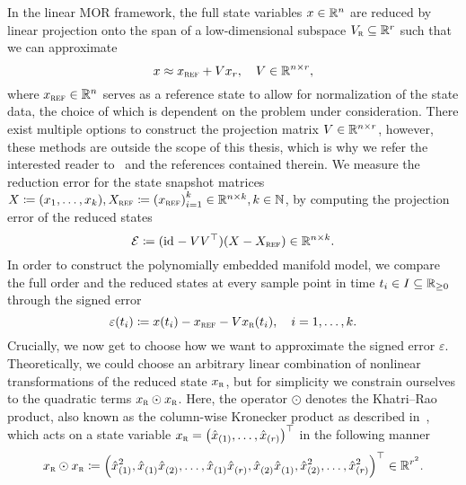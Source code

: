 In the linear MOR framework, the full state variables $x \in \mathbb{R}^n$ are reduced by linear projection onto the span of a low-dimensional subspace $V_{\textnormal{\scshape r}} \subseteq \mathbb{R}^r$ such that we can approximate
\begin{equation}\label{eq:linear-state-reduction}
    x \approx x_{\textnormal{\scshape ref}} + V x_r,\quad V \in \mathbb{R}^{n \times r},
\end{equation}
where $x_{\textnormal{\scshape ref}} \in \mathbb{R}^n$ serves as a reference state to allow for normalization of the state data, the choice of which is dependent on the problem under consideration.
There exist multiple options to construct the projection matrix $V \in \mathbb{R}^{n \times r}$, however, these methods are outside the scope of this thesis, which is why we refer the interested reader to~\cite{BOP2017, BCO2017} and the references contained therein.
We measure the reduction error for the state snapshot matrices $X \coloneqq (x_1, \dots, x_k), X_{\textnormal{\scshape ref}} \coloneqq {(x_{\textnormal{\scshape ref}})}_{i = 1}^k \in \mathbb{R}^{n \times k},k \in \mathbb{N}$, by computing the projection error of the reduced states
\begin{equation}
    \mathcal{E} \coloneqq (\text{id}_{} - V V^{\top}) (X - X_{\textnormal{\scshape ref}}) \in \mathbb{R}^{n \times k}.
\end{equation}
In order to construct the polynomially embedded manifold model, we compare the full order and the reduced states at every sample point in time $t_i \in I \subseteq \mathbb{R}_{\geq 0}$ through the signed error
\begin{equation}\label{eq:linear-signed-error}
    \varepsilon(t_i) \coloneqq x(t_i) - x_{\textnormal{\scshape ref}} - V x_{\textnormal{\scshape r}}(t_i),\quad i = 1, \dots, k.
\end{equation}
Crucially, we now get to choose how we want to approximate the signed error $\varepsilon$.
Theoretically, we could choose an arbitrary linear combination of nonlinear transformations of the reduced state $x_{\textnormal{\scshape r}}$, but for simplicity we constrain ourselves to the quadratic terms $x_{\textnormal{\scshape r}} \odot x_{\textnormal{\scshape r}}$.
Here, the operator $\odot$ denotes the Khatri--Rao product, also known as the column-wise Kronecker product as described in~\cite{Slyusar1999, Shuangzhe2008, Favier2021}, which acts on a state variable $x_{\textnormal{\scshape r}} = {\left( \hat{x}_{(1)}, \dots, \hat{x}_{(r)} \right)}^{\top}$ in the following manner
\begin{equation}\label{eq:redundant-khatri-rao}
    x_{\textnormal{\scshape r}} \odot x_{\textnormal{\scshape r}} \coloneqq {\left( \hat{x}_{(1)}^2, \hat{x}_{(1)}^{\phantom{1}} \hat{x}_{(2)}^{\phantom{1}}, \dots, \hat{x}_{(1)}^{\phantom{1}} \hat{x}_{(r)}^{\phantom{1}}, \hat{x}_{(2)}^{\phantom{1}} \hat{x}_{(1)}^{\phantom{1}}, \hat{x}_{(2)}^2, \dots, \hat{x}_{(r)}^2 \right)}^{\top} \in \mathbb{R}^{r^2}.
\end{equation}
